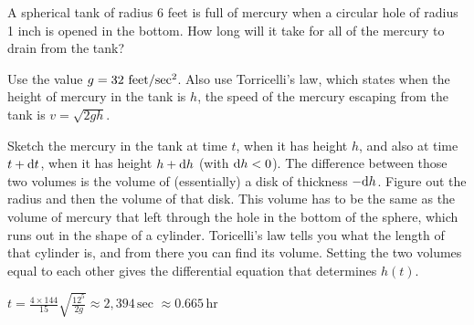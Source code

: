 


\begin{question}[2000D]
A spherical tank of radius 6 feet is full of mercury when
a circular hole of radius 1 inch is opened in the bottom. How long will
it take for all of the mercury to drain from the tank?

\noindent Use the value
$g=32\ {\rm feet}/{\rm sec}^2$.
Also use Torricelli's law, which states when the height of mercury in the tank
is $h$, the speed of the mercury escaping from the tank is $v=\sqrt{2gh}$.
\end{question}

\begin{hint}
Sketch the mercury in the tank at time $t$,  when it has height $h$,
and also at time $t+\mathrm{d}t$, when it has height $h+\mathrm{d}h$ (with $\mathrm{d}h<0$).
The difference between those two volumes is the volume of (essentially)
a disk of thickness $-\mathrm{d}h$. Figure out the radius and then the volume
of that disk. This volume has to be the same as the volume of mercury that
left through the hole in the bottom of the sphere, which runs out in the shape of a cylinder. Toricelli's law tells
you what the length of that cylinder is, and from there you can find its volume. Setting the two volumes equal to each other gives
the differential equation that determines $h(t)$.
\end{hint}

\begin{answer}
$\displaystyle t=\frac{4\times 144}{15} \sqrt{\frac{12^5}{2g}}
   \approx 2,394\,\text{sec }\approx 0.665\, \text{hr}$
\end{answer}

